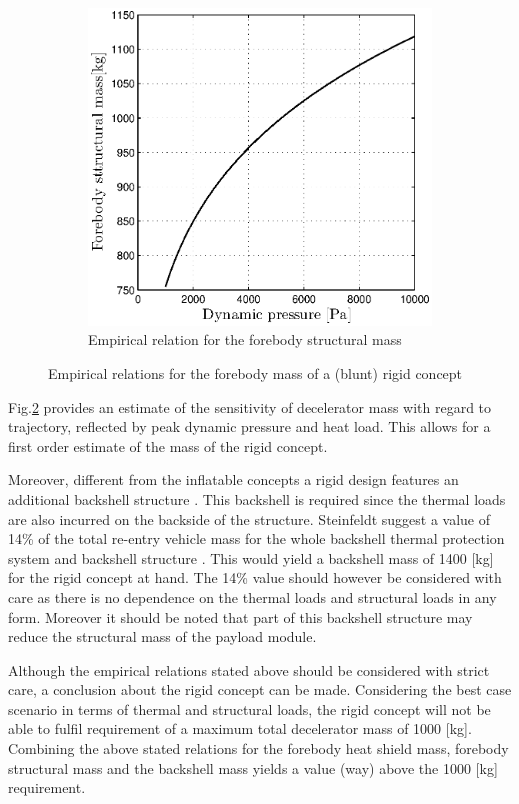 \begin{figure}[h]
\begin{subfigure}[b]{0.49\textwidth}
	\includegraphics[width=1.0\textwidth]{Figure/rigidstruct.eps}
	\caption{Empirical relation for the forebody structural mass} 
	\label{fig:rigidstruct}
	\end{subfigure}
	\caption{Empirical relations for the forebody mass of a (blunt) rigid concept}
	\label{fig:rigid}
\end{figure}

Fig.\ref{fig:rigid} provides an estimate of the sensitivity of decelerator mass with regard to trajectory, reflected by peak dynamic pressure and heat load. This allows for a first order estimate of the mass of the rigid concept.

Moreover, different from the inflatable concepts a rigid design features an additional backshell structure \cite{Hughes2005}. This backshell is required since the thermal loads are also incurred on the backside of the structure. Steinfeldt suggest a value of 14\% of the total re-entry vehicle mass for the whole backshell thermal protection system and backshell structure \cite{Steinfeldt2009}. This would yield a backshell mass of 1400 [kg] for the rigid concept at hand. The 14\% value should however be considered with care as there is no dependence on the thermal loads and structural loads in any form. Moreover it should be noted that part of this backshell structure may reduce the structural mass of the payload module.

Although the empirical relations stated above should be considered with strict care, a conclusion about the rigid concept can be made. Considering the best case scenario in terms of thermal and structural loads, the rigid concept will not be able to fulfil requirement of a maximum total decelerator mass of 1000 [kg]. Combining the above stated relations for the forebody heat shield mass, forebody structural mass and the backshell mass yields a value (way) above the 1000 [kg] requirement.

